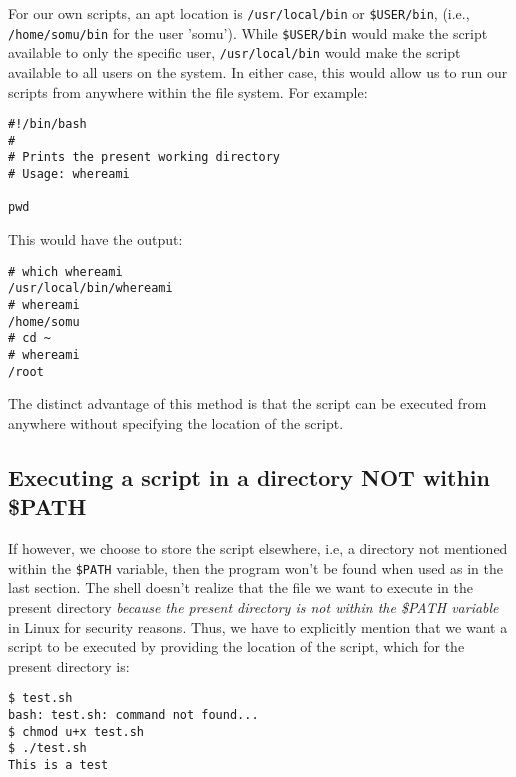 \noindent
For our own scripts, an apt location is \verb|/usr/local/bin| or \verb|$USER/bin|, (i.e., \verb|/home/somu/bin| for the user 'somu'). While \verb|$USER/bin| would make the script available to only the specific user, \verb|/usr/local/bin| would make the script available to all users on the system. In either case, this would allow us to run our scripts from anywhere within the file system. For example:

\vspace{-15pt}
\begin{verbatim}
#!/bin/bash
#
# Prints the present working directory
# Usage: whereami

pwd
\end{verbatim}
\vspace{-10pt}	

\noindent
This would have the output:

\vspace{-15pt}
\begin{verbatim}
# which whereami
/usr/local/bin/whereami
# whereami
/home/somu
# cd ~
# whereami 
/root
\end{verbatim}
\vspace{-10pt}	

\noindent
The distinct advantage of this method is that the script can be executed from anywhere without specifying the location of the script. 

\subsection{Executing a script in a directory NOT within \$PATH}	
If however, we choose to store the script elsewhere, i.e, a directory not mentioned within the \verb|$PATH| variable, then the program won't be found when used as in the last section. The shell doesn't realize that the file we want to execute in the present directory \textit{because the present directory is not within the \$PATH variable} in Linux for security reasons. Thus, we have to explicitly mention that we want a script to be executed by providing the location of the script, which for the present directory is:

\vspace{-15pt}
\begin{verbatim}
$ test.sh
bash: test.sh: command not found...
$ chmod u+x test.sh 
$ ./test.sh 
This is a test
\end{verbatim}
\vspace{-10pt}	


